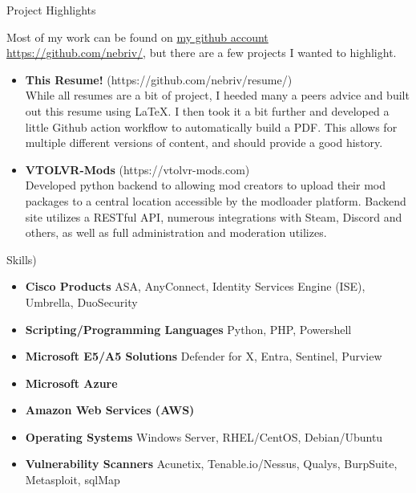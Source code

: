 \documentclass[]{mcdowellcv}
\begin{document}
\begin{cvsection}{Project Highlights}
    \begin{cvsubsection}{}{}{}
        Most of my work can be found on \href{https://github.com/nebriv/}{my github account https://github.com/nebriv/}, but there are a few projects I wanted to highlight.\\
        \begin{itemize}
            \setlength\itemsep{3pt}
            \item \textbf{This Resume!} (https://github.com/nebriv/resume/)\\While all resumes are a bit of project, I heeded many a peers advice and built out this resume using LaTeX. I then took it a bit further and developed a little Github action workflow to automatically build a PDF. This allows for multiple different versions of content, and should provide a good history.
            \item \textbf{VTOLVR-Mods} (https://vtolvr-mods.com)\\Developed python backend to allowing mod creators to upload their mod packages to a central location accessible by the modloader platform. Backend site utilizes a RESTful API, numerous integrations with Steam, Discord and others, as well as full administration and moderation utilizes.
        \end{itemize}
    \end{cvsubsection}
\end{cvsection}

\begin{cvsection}{Skills)}
    \begin{cvsubsection}{}{}{}
        \begin{itemize}
            \item \textbf{Cisco Products}  ASA, AnyConnect, Identity Services Engine (ISE), Umbrella, DuoSecurity
            \item \textbf{Scripting/Programming Languages}  Python, PHP, Powershell
            \item \textbf{Microsoft E5/A5 Solutions}  Defender for X, Entra, Sentinel, Purview
            \item \textbf{Microsoft Azure}
            \item \textbf{Amazon Web Services (AWS)}
            \item \textbf{Operating Systems}  Windows Server, RHEL/CentOS, Debian/Ubuntu
            \item \textbf{Vulnerability Scanners}  Acunetix, Tenable.io/Nessus, Qualys, BurpSuite, Metasploit, sqlMap
        \end{itemize}
    \end{cvsubsection}
\end{cvsection}
\end{document}
